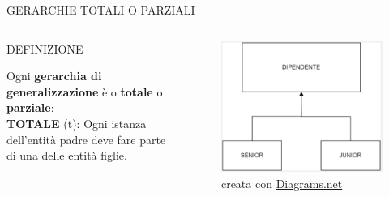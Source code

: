 \documentclass[aspectratio=1610]{beamer}
\begin{document}
\begin{frame}{GERARCHIE TOTALI O PARZIALI}
    \begin{columns}
            \begin{alertblock}{DEFINIZIONE}
                \begin{minipage}{0.96\linewidth}
                    \justifying
                    Ogni \textbf{gerarchia di generalizzazione} è o \textbf{totale} o \textbf{parziale}:\\
                    \bigskip
                    \textbf{TOTALE} (t): Ogni istanza dell'entità padre deve fare parte di una delle entità figlie.\\
                    \bigskip
                \end{minipage}
            \end{alertblock}
            \begin{figure}
        \includegraphics[width=.8\linewidth]{img/totale.png}
        \caption{{creata con \href{https://app.diagrams.net/}{Diagrams.net}}}
            \end{figure}
    \end{columns}
\end{frame}
\end{document}
